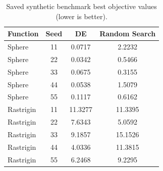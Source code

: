 \begin{table}[htbp]\centering\caption{Saved synthetic benchmark best objective values (lower is better).}\label{tab:synthetic}\begin{tabularx}{\textwidth}{lCCC}\toprule Function&Seed&DE&Random Search\\\midrule
Sphere & 11 & 0.0717 & 2.2232\\
Sphere & 22 & 0.0342 & 0.5466\\
Sphere & 33 & 0.0675 & 0.3155\\
Sphere & 44 & 0.0538 & 1.5079\\
Sphere & 55 & 0.1117 & 0.6162\\\midrule
Rastrigin & 11 & 11.3277 & 11.3395\\
Rastrigin & 22 & 7.6343 & 5.0592\\
Rastrigin & 33 & 9.1857 & 15.1526\\
Rastrigin & 44 & 4.0336 & 11.3815\\
Rastrigin & 55 & 6.2468 & 9.2295\\\bottomrule\end{tabularx}\end{table}

